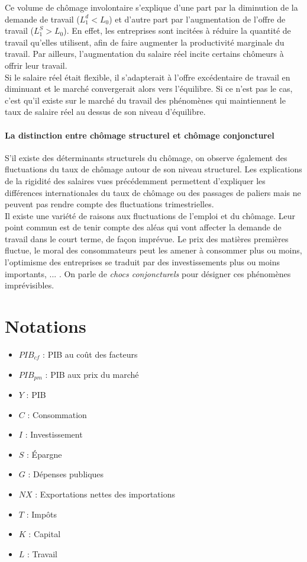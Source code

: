 \documentclass[10pt]{book}
\begin{document}
Ce volume de chômage involontaire s'explique d'une part par la diminution de la demande de travail ($L_1^d < L_0$) et d'autre part par l'augmentation de l'offre de travail ($L_1^S > L_0$). En effet, les entreprises sont incitées à réduire la quantité de travail qu'elles utilisent, afin de faire augmenter la productivité marginale du travail. Par ailleurs, l'augmentation du salaire réel incite certains chômeurs à offrir leur travail. \\
Si le salaire réel était flexible, il s'adapterait à l'offre excédentaire de travail en diminuant et le marché convergerait alors vers l'équilibre. Si ce n'est pas le cas, c'est qu'il existe sur le marché du travail des phénomènes qui maintiennent le taux de salaire réel au dessus de son niveau d'équilibre.
\subsubsection{La distinction entre chômage structurel et chômage conjoncturel}
S'il existe des déterminants structurels du chômage, on observe également des fluctuations du taux de chômage autour de son niveau structurel. Les explications de la rigidité des salaires vues précédemment permettent d'expliquer les différences internationales du taux de chômage ou des passages de paliers mais ne peuvent pas rendre compte des fluctuations trimestrielles. \\
Il existe une variété de raisons aux fluctuations de l'emploi et du chômage. Leur point commun est de tenir compte des aléas qui vont affecter la demande de travail dans le court terme, de façon imprévue. Le prix des matières premières fluctue, le moral des consommateurs peut les amener à consommer plus ou moins, l'optimisme des entreprises se traduit par des investissements plus ou moins importants, ... . On parle de \textit{chocs conjoncturels} pour désigner ces phénomènes imprévisibles.




\appendix
\chapter{Notations} 
\begin{itemize}
  \item $PIB_{cf}$ : PIB au coût des facteurs
  \item $PIB_{pm}$ : PIB aux prix du marché
  \item $Y$ : PIB
  \item $C$ : Consommation
  \item $I$ : Investissement
  \item $S$ : Épargne
  \item $G$ : Dépenses publiques
  \item $NX$ : Exportations nettes des importations
  \item $T$ : Impôts
  \item $K$ : Capital
  \item $L$ : Travail
\end{itemize}
\end{document}
